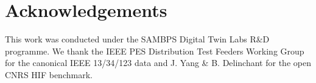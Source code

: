 \documentclass[conference]{IEEEtran}
\begin{document}
\section*{Acknowledgements}
This work was conducted under the SAMBPS Digital Twin Labs R\&D
programme.  We thank the IEEE PES Distribution Test Feeders
Working Group for the canonical IEEE 13/34/123 data and J. Yang
\& B. Delinchant for the open CNRS HIF benchmark.



\end{document}
